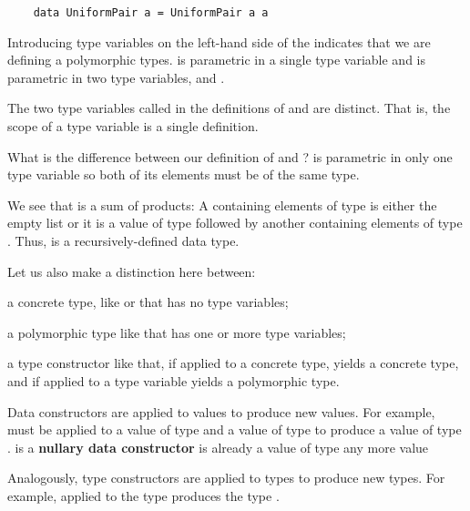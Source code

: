 \begin{notelist}
\begin{lstlisting}
    data UniformPair a = UniformPair a a
    \end{lstlisting}
    \begin{notelist}
        \item Introducing type variables on the left-hand side of the \code{=} indicates that we are
              defining a polymorphic types.  is parametric in a single type variable 
              and  is parametric in two type variables,  and . 
        \item The two type variables called  in the definitions of  and  are
              distinct. That is, the scope of a type variable is a single  definition.
        \item What is the difference between our definition of  and ? 
              is parametric in only one type variable so both of its elements must be of the same type.
        \item We see that  is a sum of products: A  containing elements of type  is either
              the empty list  or it is a value of type  followed by another
               containing elements of type . Thus,  is a recursively-defined data type.
        \item Let us also make a distinction here between:
        \begin{notelist}
            \item a concrete type, like  or  that has
                  no type variables;
            \item a polymorphic type like  that has one or more type variables;
            \item a type constructor like  that, if applied to a concrete type,
                  yields a concrete type, and if applied to a type variable yields a polymorphic type.
            \begin{notelist}
                \item Data constructors are applied to values to produce new values. For example,  must
                      be applied to a value of type  and a value of type  to produce a value
                      of type .  is a \textbf{nullary data constructor} is already a value
                      of type 
                      any more value
                \item Analogously, type constructors are applied to types to produce new types. For example,  applied
                      to the type  produces the type . 
            \end{notelist}
        \end{notelist}
    \end{notelist}
\end{notelist}


